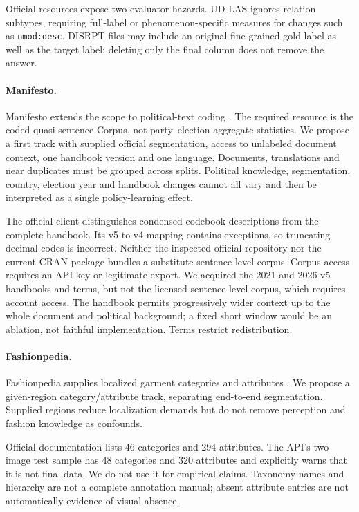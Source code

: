 \documentclass[11pt]{article}
\begin{document}
Official resources expose two evaluator hazards. UD LAS ignores relation subtypes, requiring full-label or phenomenon-specific measures for changes such as \texttt{nmod:desc}. DISRPT files may include an original fine-grained gold label as well as the target label; deleting only the final column does not remove the answer.

\paragraph{Manifesto.}
Manifesto extends the scope to political-text coding \citep{manifesto}. The required resource is the coded quasi-sentence Corpus, not party--election aggregate statistics. We propose a first track with supplied official segmentation, access to unlabeled document context, one handbook version and one language. Documents, translations and near duplicates must be grouped across splits. Political knowledge, segmentation, country, election year and handbook changes cannot all vary and then be interpreted as a single policy-learning effect.

The official client distinguishes condensed codebook descriptions from the complete handbook. Its v5-to-v4 mapping contains exceptions, so truncating decimal codes is incorrect. Neither the inspected official repository nor the current CRAN package bundles a substitute sentence-level corpus. Corpus access requires an API key or legitimate export. We acquired the 2021 and 2026 v5 handbooks and terms, but not the licensed sentence-level corpus, which requires account access. The handbook permits progressively wider context up to the whole document and political background; a fixed short window would be an ablation, not faithful implementation. Terms restrict redistribution.

\paragraph{Fashionpedia.}
Fashionpedia supplies localized garment categories and attributes \citep{fashionpedia}. We propose a given-region category/attribute track, separating end-to-end segmentation. Supplied regions reduce localization demands but do not remove perception and fashion knowledge as confounds.

Official documentation lists 46 categories and 294 attributes. The API's two-image test sample has 48 categories and 320 attributes and explicitly warns that it is not final data. We do not use it for empirical claims. Taxonomy names and hierarchy are not a complete annotation manual; absent attribute entries are not automatically evidence of visual absence.
\end{document}
